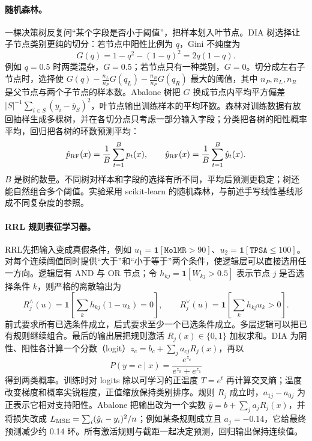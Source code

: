\documentclass[UTF8,a4paper,11pt]{ctexart}
\begin{document}
\paragraph{随机森林。}一棵决策树反复问“某个字段是否小于阈值”，把样本划入叶节点。DIA 树选择让子节点类别更纯的切分：若节点中阳性比例为 $q$，Gini 不纯度为
\begin{equation}
G(q)=1-q^2-(1-q)^2=2q(1-q).
\end{equation}
例如 $q=0.5$ 时两类混杂，$G=0.5$；若节点只有一种类别，$G=0$。切分成左右子节点时，选择使 $G(q)-\frac{n_L}{n_P}G(q_L)-\frac{n_R}{n_P}G(q_R)$ 最大的阈值，其中 $n_P,n_L,n_R$ 是父节点与两个子节点的样本数。Abalone 树把 $G$ 换成节点内平均平方偏差 $|S|^{-1}\sum_{i\in S}(y_i-\bar y_S)^2$，叶节点输出训练样本的平均环数。森林对训练数据有放回抽样生成多棵树，并在各切分点只考虑一部分输入字段；分类把各树的阳性概率平均，回归把各树的环数预测平均：
\begin{equation}
\hat p_{\rm RF}(x)=\frac1B\sum_{t=1}^{B}p_t(x),\qquad
\hat y_{\rm RF}(x)=\frac1B\sum_{t=1}^{B}\hat y_t(x).
\label{eq:forest}
\end{equation}
$B$ 是树的数量。不同树对样本和字段的选择有所不同，平均后预测更稳定；树还能自然组合多个阈值。实验采用 scikit-learn 的随机森林，与前述手写线性基线形成不同复杂度的参照。

\paragraph{RRL 规则表征学习器。}RRL\cite{rrl}先把输入变成真假条件，例如 $u_1=\mathbf1[\texttt{MolMR}>90]$、$u_2=\mathbf1[\texttt{TPSA}\le100]$。对每个连续阈值同时提供“大于”和“小于等于”两个条件，使逻辑层可以直接选用任一方向。逻辑层有 AND 与 OR 节点；令 $h_{kj}=\mathbf1[W_{kj}>0.5]$ 表示节点 $j$ 是否选择条件 $k$，则严格的离散输出为
\begin{equation}
R_j^{\land}(u)=\mathbf1\!\left[\sum_kh_{kj}(1-u_k)=0\right],\qquad
R_j^{\lor}(u)=\mathbf1\!\left[\sum_kh_{kj}u_k>0\right].
\label{eq:logic}
\end{equation}
前式要求所有已选条件成立，后式要求至少一个已选条件成立。多层逻辑可以把已有规则继续组合。最后的输出层把规则激活 $R_j(x)\in\{0,1\}$ 加权求和。DIA 为阴性、阳性各计算一个分数（logit）$z_c=b_c+\sum_ja_{cj}R_j(x)$，再以
\begin{equation}
P(y=c\mid x)=\frac{e^{z_c}}{e^{z_0}+e^{z_1}}
\label{eq:softmax}
\end{equation}
得到两类概率。训练时对 logits 除以可学习的正温度 $T=e^t$ 再计算交叉熵；温度改变梯度和概率尖锐程度，正值缩放保持类别排序。规则 $R_j$ 成立时，$a_{1j}-a_{0j}$ 为正表示它相对支持阳性。Abalone 把输出改为一个实数
$\hat y=b+\sum_ja_jR_j(x)$，并将损失改成 $L_{\rm MSE}=\sum_i(\hat y_i-y_i)^2/n$；例如某条规则成立且 $a_j=-0.14$，它给最终预测减少约 0.14 环。所有激活规则与截距一起决定预测，回归输出保持连续值。
\end{document}
